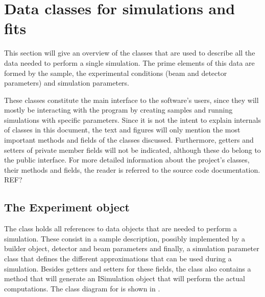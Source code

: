 

\section{Data classes for simulations and fits}
This section will give an overview of the classes that are used to describe all the data needed to perform a single simulation. The prime elements of this data are formed by the sample, the experimental conditions (beam and detector parameters) and simulation parameters.

These classes constitute the main interface to the software's users, since they will mostly be interacting with the program by creating samples and running simulations with specific parameters. Since it is not the intent to explain internals of classes in this document, the text and figures will only mention the most important methods and fields of the classes discussed. Furthermore, getters and setters of private member fields will not be indicated, although these do belong to the public interface. For more detailed information about the project's classes, their methods and fields, the reader is referred to the source code documentation. REF?



\subsection{The Experiment object}
The  class holds all references to data objects that are needed to perform a simulation. These consist in a sample description, possibly implemented by a builder object, detector and beam parameters and finally, a simulation parameter class that defines the different approximations that can be used during a simulation. Besides getters and setters for these fields, the class also contains a  method that will generate an ISimulation object that will perform the actual computations. The class diagram for  is shown in .

